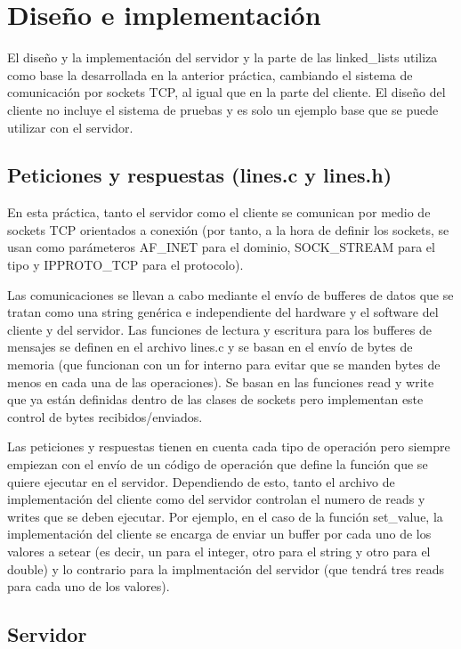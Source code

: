 \section{Diseño e implementación}
El diseño y la implementación del servidor y la parte de las linked\_lists utiliza como base la desarrollada en la anterior práctica, cambiando el sistema de comunicación por sockets TCP, al igual que en la parte del cliente. El diseño del cliente no incluye el sistema de pruebas y es solo un ejemplo base que se puede utilizar con el servidor.

\subsection{Peticiones y respuestas (lines.c y lines.h)}

En esta práctica, tanto el servidor como el cliente se comunican por medio de sockets TCP orientados a conexión (por tanto, a la hora de definir los sockets, se usan como parámeteros AF\_INET para el dominio, SOCK\_STREAM para el tipo y IPPROTO\_TCP para el protocolo).

Las comunicaciones se llevan a cabo mediante el envío de bufferes de datos que se tratan como una string genérica e independiente del hardware y el software del cliente y del servidor. Las funciones de lectura y escritura para los bufferes de mensajes se definen en el archivo lines.c y se basan en el envío de bytes de memoria (que funcionan con un for interno para evitar que se manden bytes de menos en cada una de las operaciones). Se basan en las funciones read y write que ya están definidas dentro de las clases de sockets pero implementan este control de bytes recibidos/enviados.

Las peticiones y respuestas tienen en cuenta cada tipo de operación pero siempre empiezan con el envío de un código de operación que define la función que se quiere ejecutar en el servidor. Dependiendo de esto, tanto el archivo de implementación del cliente como del servidor controlan el numero de reads y writes que se deben ejecutar. Por ejemplo, en el caso de la función set\_value, la implementación del cliente se encarga de enviar un buffer por cada uno de los valores a setear (es decir, un para el integer, otro para el string y otro para el double) y lo contrario para la implmentación del servidor (que tendrá tres reads para cada uno de los valores).

\subsection{Servidor}

